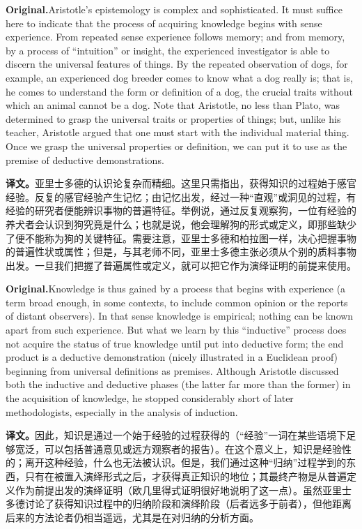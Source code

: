 \documentclass[UTF8]{ctexart}
\newcommand{\orig}{\par\noindent\textbf{Original.}\quad}
\newcommand{\zh}{\par\noindent\textbf{译文。}\quad}
\begin{document}
\orig Aristotle's epistemology is complex and sophisticated. It must suffice here to indicate that the process of acquiring knowledge begins with sense experience. From repeated sense experience follows memory; and from memory, by a process of ``intuition'' or insight, the experienced investigator is able to discern the universal features of things. By the repeated observation of dogs, for example, an experienced dog breeder comes to know what a dog really is; that is, he comes to understand the form or definition of a dog, the crucial traits without which an animal cannot be a dog. Note that Aristotle, no less than Plato, was determined to grasp the universal traits or properties of things; but, unlike his teacher, Aristotle argued that one must start with the individual material thing. Once we grasp the universal properties or definition, we can put it to use as the premise of deductive demonstrations.

\zh 亚里士多德的认识论复杂而精细。这里只需指出，获得知识的过程始于感官经验。反复的感官经验产生记忆；由记忆出发，经过一种“直观”或洞见的过程，有经验的研究者便能辨识事物的普遍特征。举例说，通过反复观察狗，一位有经验的养犬者会认识到狗究竟是什么；也就是说，他会理解狗的形式或定义，即那些缺少了便不能称为狗的关键特征。需要注意，亚里士多德和柏拉图一样，决心把握事物的普遍性状或属性；但是，与其老师不同，亚里士多德主张必须从个别的质料事物出发。一旦我们把握了普遍属性或定义，就可以把它作为演绎证明的前提来使用。

\orig Knowledge is thus gained by a process that begins with experience (a term broad enough, in some contexts, to include common opinion or the reports of distant observers). In that sense knowledge is empirical; nothing can be known apart from such experience. But what we learn by this ``inductive'' process does not acquire the status of true knowledge until put into deductive form; the end product is a deductive demonstration (nicely illustrated in a Euclidean proof) beginning from universal definitions as premises. Although Aristotle discussed both the inductive and deductive phases (the latter far more than the former) in the acquisition of knowledge, he stopped considerably short of later methodologists, especially in the analysis of induction.

\zh 因此，知识是通过一个始于经验的过程获得的（“经验”一词在某些语境下足够宽泛，可以包括普通意见或远方观察者的报告）。在这个意义上，知识是经验性的；离开这种经验，什么也无法被认识。但是，我们通过这种“归纳”过程学到的东西，只有在被置入演绎形式之后，才获得真正知识的地位；其最终产物是从普遍定义作为前提出发的演绎证明（欧几里得式证明很好地说明了这一点）。虽然亚里士多德讨论了获得知识过程中的归纳阶段和演绎阶段（后者远多于前者），但他距离后来的方法论者仍相当遥远，尤其是在对归纳的分析方面。
\end{document}

